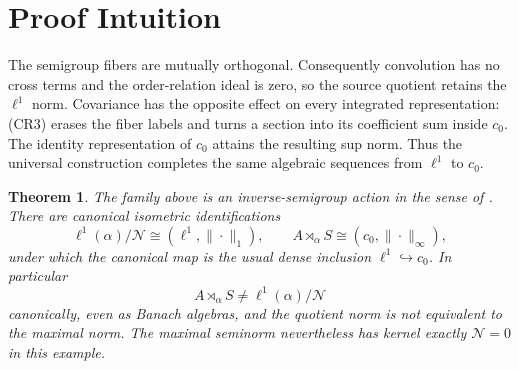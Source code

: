 \documentclass[10pt]{article}
\newtheorem{theorem}{Theorem}
\newcommand{\Null}{\mathcal N}
\begin{document}
\section{Proof Intuition}
The semigroup fibers are mutually orthogonal.  Consequently convolution has
no cross terms and the order-relation ideal is zero, so the source quotient
retains the $\ell^1$ norm.  Covariance has the opposite effect on every
integrated representation: (CR3) erases the fiber labels and turns a section
into its coefficient sum inside $c_0$.  The identity representation of $c_0$
attains the resulting sup norm.  Thus the universal construction completes
the same algebraic sequences from $\ell^1$ to $c_0$.

\begin{theorem}\label{thm:main}
The family above is an inverse-semigroup action in the sense of
\cite{BK}.  There are canonical isometric identifications
\[
 \ell^1(\alpha)/\Null\cong (\ell^1,\|\cdot\|_1),
 \qquad
 A\rtimes_\alpha S\cong(c_0,\|\cdot\|_\infty),
\]
under which the canonical map is the usual dense inclusion
$\ell^1\hookrightarrow c_0$.  In particular
\[
 A\rtimes_\alpha S\ne \ell^1(\alpha)/\Null
\]
canonically, even as Banach algebras, and the quotient norm is not equivalent
to the maximal norm.  The maximal seminorm nevertheless has kernel exactly
$\Null=0$ in this example.
\end{theorem}
\end{document}
